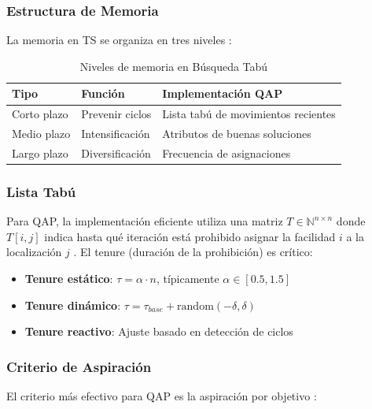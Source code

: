\documentclass[12pt, a4paper]{article}
\begin{document}
\subsubsection{Estructura de Memoria}

La memoria en TS se organiza en tres niveles \cite{glover1997}:

\begin{table}[H]
\centering
\caption{Niveles de memoria en Búsqueda Tabú}
\begin{tabular}{@{}lll@{}}
\toprule
\textbf{Tipo} & \textbf{Función} & \textbf{Implementación QAP} \\
\midrule
Corto plazo & Prevenir ciclos & Lista tabú de movimientos recientes \\
Medio plazo & Intensificación & Atributos de buenas soluciones \\
Largo plazo & Diversificación & Frecuencia de asignaciones \\
\bottomrule
\end{tabular}
\end{table}

\subsubsection{Lista Tabú}

Para QAP, la implementación eficiente utiliza una matriz $T \in \mathbb{N}^{n \times n}$ donde $T[i,j]$ indica hasta qué iteración está prohibido asignar la facilidad $i$ a la localización $j$ \cite{taillard1991}. El tenure (duración de la prohibición) es crítico:

\begin{itemize}
    \item \textbf{Tenure estático}: $\tau = \alpha \cdot n$, típicamente $\alpha \in [0.5, 1.5]$ \cite{taillard1991}
    \item \textbf{Tenure dinámico}: $\tau = \tau_{base} + \text{random}(-\delta, \delta)$ \cite{battiti1994}
    \item \textbf{Tenure reactivo}: Ajuste basado en detección de ciclos \cite{battiti1994}
\end{itemize}

\subsubsection{Criterio de Aspiración}

El criterio más efectivo para QAP es la aspiración por objetivo \cite{glover1989}:
\end{document}

